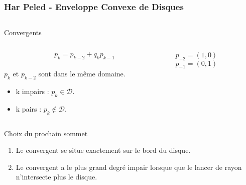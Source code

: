 \begin{frame}
\frametitle{Har Peled - Enveloppe Convexe de Disques}

\begin{columns}[t]
  \begin{column}{0.7\linewidth}
    \begin{block}{Convergents}
      
      \begin{columns}[t]
        \begin{column}{0.6\linewidth}
          \alert{$$p_{k} = p_{k-2} + q_k p_{k-1}$$}\\
          $p_{k}$ et $p_{k-2}$ sont dans le même domaine.
          \begin{itemize}
            \item k impairs : $p_k \in \mathcal{D}$.
            \item k pairs : $p_k \not\in \mathcal{D}$.
          \end{itemize}
        \end{column}
        \begin{column}{0.4\linewidth}
        $p_{-2} = (1,0)$\\
        $p_{-1} = (0,1)$\\
        \end{column}
      \end{columns}     
    \end{block}  
     \begin{block}{Choix du prochain sommet}   
      \begin{enumerate}
        \item Le convergent se situe exactement sur le bord du disque.
        \item Le convergent a le plus grand degré impair lorsque que le lancer de rayon n’intersecte plus le disque.
      \end{enumerate}
    \end{block}     
  \end{column}
  

\end{columns}
\end{frame}
